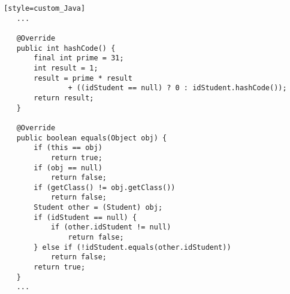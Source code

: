 
\begin{lstlisting} [style=custom_Java] 	
	...
	
	@Override
	public int hashCode() {
		final int prime = 31;
		int result = 1;
		result = prime * result
				+ ((idStudent == null) ? 0 : idStudent.hashCode());
		return result;
	}

	@Override
	public boolean equals(Object obj) {
		if (this == obj)
			return true;
		if (obj == null)
			return false;
		if (getClass() != obj.getClass())
			return false;
		Student other = (Student) obj;
		if (idStudent == null) {
			if (other.idStudent != null)
				return false;
		} else if (!idStudent.equals(other.idStudent))
			return false;
		return true;
	}
	...
\end{lstlisting}
